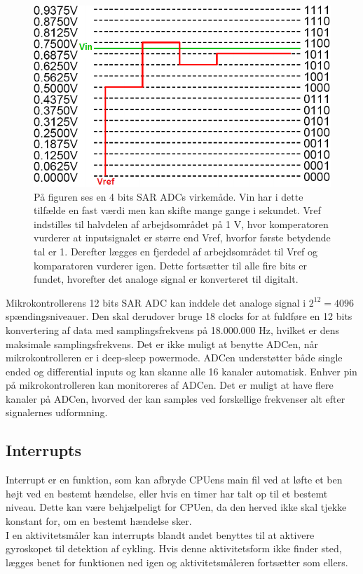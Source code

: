\begin{figure}[H]
	\centering
	\includegraphics[scale=0.6]{figures/bProblemloesning/SAR_ADC.png}
	\caption{På figuren ses en 4 bits SAR ADCs virkemåde. Vin har i dette tilfælde en fast værdi men kan skifte mange gange i sekundet. Vref indstilles til halvdelen af arbejdsområdet på 1 V, hvor komperatoren vurderer at inputsignalet er større end Vref, hvorfor første betydende tal er 1. Derefter lægges en fjerdedel af arbejdsområdet til Vref og komparatoren vurderer igen. Dette fortsætter til alle fire bits er fundet, hvorefter det analoge signal er konverteret til digitalt.}
	\label{fig:SAR_ADC}
\end{figure}\vspace{-0.5cm}

Mikrokontrollerens 12 bits SAR ADC kan inddele det analoge signal i $2^{12} = 4096$ spændingsniveauer. Den skal derudover bruge 18 clocks for at fuldføre en 12 bits konvertering af data med samplingsfrekvens på 18.000.000 Hz, hvilket er dens maksimale samplingsfrekvens. Det er ikke muligt at benytte ADCen, når mikrokontrolleren er i deep-sleep powermode. \newline 
ADCen understøtter både single ended og differential inputs og kan skanne alle 16 kanaler automatisk. Enhver pin på mikrokontrolleren kan monitoreres af ADCen. Det er muligt at have flere kanaler på ADCen, hvorved der kan samples ved forskellige frekvenser alt efter signalernes udformning. \citep{Semiconductor20164200M}

\subsection{Interrupts}
Interrupt er en funktion, som kan afbryde CPUens main fil ved at løfte et ben højt ved en bestemt hændelse, eller hvis en timer har talt op til et bestemt niveau. Dette kan være behjælpeligt for CPUen, da den herved ikke skal tjekke konstant for, om en bestemt hændelse sker. \citep{Badiger2016} \\
I en aktivitetsmåler kan interrupts blandt andet benyttes til at aktivere gyroskopet til detektion af cykling. Hvis denne aktivitetsform ikke finder sted, lægges benet for funktionen ned igen og aktivitetsmåleren fortsætter som ellers.

